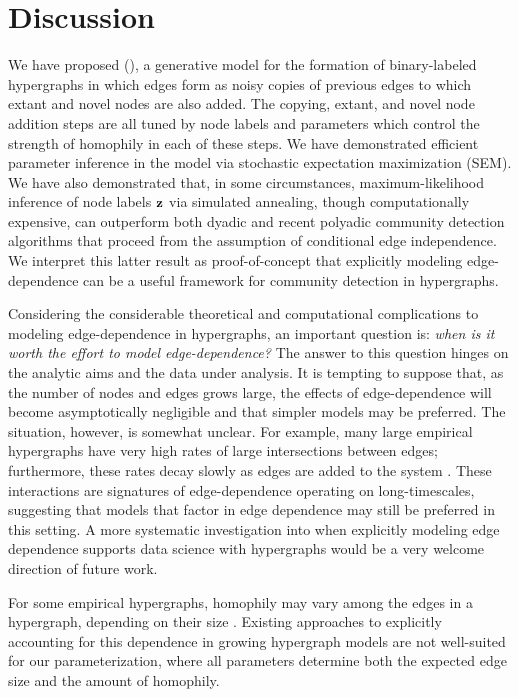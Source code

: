 \documentclass[aps,pre,reprint,superscriptaddress,nofootinbib]{revtex4-2}
\begin{document}
\section{Discussion} \label{sec:discussion}

    We have proposed \Model{} (\model{}), a generative model for the formation of binary-labeled hypergraphs in which edges form as noisy copies of previous edges to which extant and novel nodes are also added.
    The copying, extant, and novel node addition steps are all tuned by node labels and parameters which control the strength of homophily in each of these steps.
    We have demonstrated efficient parameter inference in the \model{} model via stochastic expectation maximization (SEM). 
    We have also demonstrated that, in some circumstances, maximum-likelihood inference of node labels $\mathbf{z}$ via simulated annealing, though computationally expensive, can outperform both dyadic and recent polyadic community detection algorithms that proceed from the assumption of conditional edge independence. 
    We interpret this latter result as proof-of-concept that explicitly modeling edge-dependence can be a useful framework for community detection in hypergraphs. 
    
    Considering the considerable theoretical and computational complications to modeling edge-dependence in hypergraphs, an important question is: \emph{when is it worth the effort to model edge-dependence?} 
    The answer to this question hinges on the analytic aims and the data under analysis.
    It is tempting to suppose that, as the number of nodes and edges grows large, the effects of edge-dependence will become asymptotically negligible and that simpler models may be preferred. 
    The situation, however, is somewhat unclear. 
    For example, many large empirical hypergraphs have very high rates of large intersections between edges; furthermore, these rates decay slowly as edges are added to the system \cite{heEdgeCorrelationsLink2025}.
    These interactions are signatures of edge-dependence operating on long-timescales, suggesting that models that factor in edge dependence may still be preferred in this setting. 
    A more systematic investigation into when explicitly modeling edge dependence supports data science with hypergraphs would be a very welcome direction of future work.  

    For some empirical hypergraphs, homophily may vary among the edges in a hypergraph, depending on their size \cite{veldt2023combinatorial}.
    Existing approaches to explicitly accounting for this dependence in growing hypergraph models \cite{laber2025effects} are not well-suited for our parameterization, where all parameters determine both the expected edge size and the amount of homophily.
    
\end{document}
